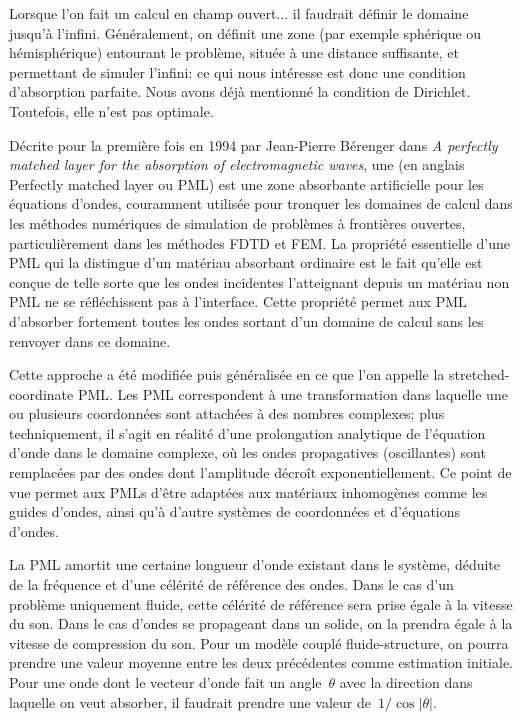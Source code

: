 {Lorsque l'on fait un calcul en champ ouvert... il faudrait définir le domaine jusqu'à l'infini.
Généralement, on définit une zone (par exemple sphérique ou hémisphérique) entourant le problème, située à une distance suffisante, et permettant de simuler l'infini: ce qui nous intéresse est donc une condition d'absorption parfaite.
Nous avons déjà mentionné la condition de Dirichlet.
Toutefois, elle n'est pas optimale.

Décrite pour la première fois en 1994 par Jean-Pierre Bérenger dans \emph{A perfectly matched layer for the absorption of electromagnetic waves}, une  (en anglais Perfectly matched layer ou PML) est une zone absorbante artificielle pour les équations d'ondes, couramment utilisée pour tronquer les domaines de calcul dans les méthodes numériques de simulation de problèmes à frontières ouvertes, particulièrement dans les méthodes FDTD et FEM.
La propriété essentielle d'une PML qui la distingue d'un matériau absorbant ordinaire est le fait qu'elle est conçue de telle sorte que les ondes incidentes l'atteignant depuis un matériau non PML ne se réfléchissent pas à l'interface. Cette propriété permet aux PML d'absorber fortement toutes les ondes sortant d'un domaine de calcul sans les renvoyer dans ce domaine.

Cette approche a été modifiée puis généralisée en ce que l'on appelle la stretched-coordinate PML. Les PML correspondent à une transformation dans laquelle une ou plusieurs coordonnées sont attachées à des nombres complexes; plus techniquement, il s'agit en réalité d'une prolongation analytique de l'équation d'onde dans le domaine complexe, où les ondes propagatives (oscillantes) sont remplacées par des ondes dont l'amplitude décroît exponentiellement. Ce point de vue permet aux PMLs d'être adaptées aux matériaux inhomogènes comme les guides d'ondes, ainsi qu'à d'autre systèmes de coordonnées et d'équations d'ondes.

La PML amortit une certaine longueur d'onde existant dans le système, déduite de la fréquence et d'une célérité de référence des ondes.
Dans le cas d'un problème uniquement fluide, cette célérité de référence sera prise égale à la vitesse du son. Dans le cas d'ondes se propageant dans un solide, on la prendra égale à la vitesse de compression du son. Pour un modèle couplé fluide-structure, on pourra prendre une valeur moyenne entre les deux précédentes comme estimation initiale. Pour une onde dont le vecteur d'onde fait un angle~$\theta$ avec la direction dans laquelle on veut absorber, il faudrait prendre une valeur de~$1/\cos|\theta|$.


}
